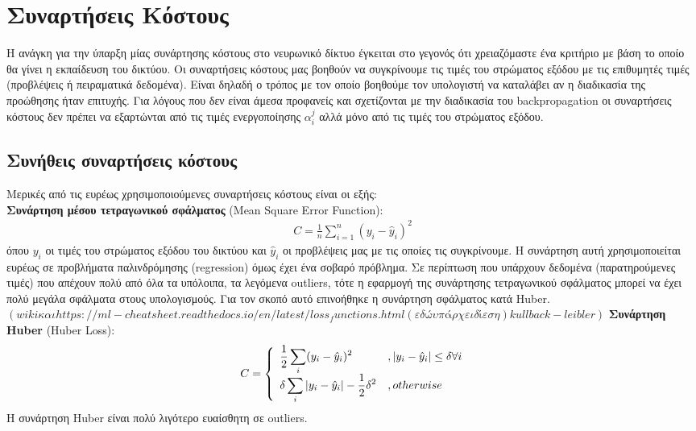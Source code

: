 \documentclass[11pt]{article} %
\numberwithin{equation}{subsection}
\begin{document}
\section{Συναρτήσεις Κόστους}
Η ανάγκη για την ύπαρξη μίας συνάρτησης κόστους στο νευρωνικό δίκτυο έγκειται στο γεγονός ότι χρειαζόμαστε ένα κριτήριο με βάση το οποίο θα γίνει η εκπαίδευση του δικτύου. Οι συναρτήσεις κόστους μας βοηθούν να συγκρίνουμε τις τιμές του στρώματος εξόδου με τις επιθυμητές τιμές (προβλέψεις ή πειραματικά δεδομένα). Είναι δηλαδή ο τρόπος με τον οποίο βοηθούμε τον υπολογιστή να καταλάβει αν η διαδικασία της προώθησης ήταν επιτυχής. Για λόγους που δεν είναι άμεσα προφανείς και σχετίζονται με την διαδικασία του backpropagation οι συναρτήσεις κόστους δεν πρέπει να εξαρτώνται από τις τιμές ενεργοποίησης $\alpha_i ^ j$ αλλά μόνο από τις τιμές του στρώματος εξόδου.\\

\subsection{Συνήθεις συναρτήσεις κόστους}

Μερικές από τις ευρέως χρησιμοποιούμενες συναρτήσεις κόστους είναι οι εξής:\\

\textbf{Συνάρτηση μέσου τετραγωνικού σφάλματος} (Mean Square Error Function):
\begin{align*}
\displaystyle C = \frac{1}{n} \sum_{i=1}^{n} (y_i - \hat{y}_i)^2
\end{align*}
όπου $y_i$ οι τιμές του στρώματος εξόδου του δικτύου και $\hat{y}_i$ οι προβλέψεις μας με τις οποίες τις συγκρίνουμε. Η συνάρτηση αυτή χρησιμοποιείται ευρέως σε προβλήματα παλινδρόμησης (regression) όμως έχει ένα σοβαρό πρόβλημα. Σε περίπτωση που υπάρχουν δεδομένα (παρατηρούμενες τιμές) που απέχουν πολύ από όλα τα υπόλοιπα, τα λεγόμενα outliers, τότε η εφαρμογή της συνάρτησης τετραγωνικού σφάλματος μπορεί να έχει πολύ μεγάλα σφάλματα στους υπολογισμούς. Για τον σκοπό αυτό επινοήθηκε η συνάρτηση σφάλματος κατά Huber. \\

$(wiki και https://ml-cheatsheet.readthedocs.io/en/latest/loss_functions.html(εδώ υπάρχει δίεση)kullback-leibler)$
\textbf{Συνάρτηση Huber} (Huber Loss):
\[ 
\ C = \left\{
\begin{array}{ll}
    \displaystyle \frac{1}{2} \sum_{i} (y_i - \hat{y}_i)^2 & , \abs{y_i - \hat{y}_i} \leq \delta \forall i\\
    \displaystyle \delta \sum_{i} \abs{y_i - \hat{y}_i} - \frac{1}{2} \delta ^ 2& ,otherwise\\
\end{array} 
\right. 
\]
Η συνάρτηση Huber είναι πολύ λιγότερο ευαίσθητη σε outliers.\\
\end{document}
